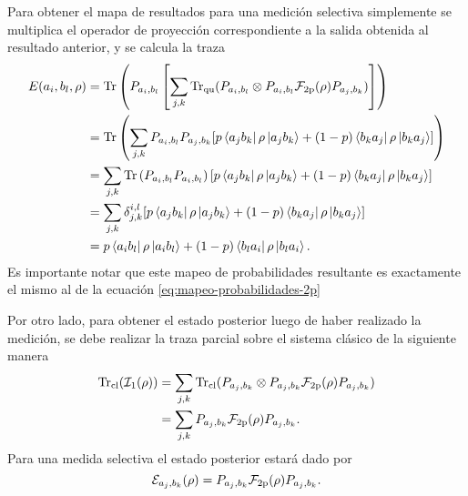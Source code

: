 Para obtener el mapa de resultados para una medición selectiva simplemente se
multiplica el operador de proyección correspondiente a la salida obtenida al
resultado anterior, y se calcula la traza\[\begin{split}
    E(a_i,b_l,\rho)&={\rm Tr}\left(P_{a_i, b_l}\left[\sum_{j,k}{\rm Tr}_{\text{qu}}(P_{a_i,b_l}\otimes P_{a_i,b_l} \mathcal{F}_{2\text{p}}(\rho) P_{a_j,b_k})\right]\right)\\
    &={\rm Tr}\left(\sum_{j,k} P_{a_i,b_l}P_{a_j,b_k}[p \bra{a_j b_k}\rho\ket{a_j b_k} +(1-p)\bra{b_k a_j}\rho \ket{b_k a_j}]\right)\\
    &=\sum_{j,k}{\rm Tr}\left( P_{a_i,b_l}P_{a_i,b_l}\right)[p \bra{a_j b_k}\rho\ket{a_j b_k} +(1-p)\bra{b_k a_j}\rho \ket{b_k a_j}]\\
    &=\sum_{j,k}\delta^{i,l}_{j,k}[p \bra{a_j b_k}\rho\ket{a_j b_k} +(1-p)\bra{b_k a_j}\rho \ket{b_k a_j}]\\
    &=p \bra{a_i b_l}\rho\ket{a_i b_l} +(1-p)\bra{b_l a_i}\rho \ket{b_l a_i}.
\end{split}\]Es importante notar que este mapeo de probabilidades resultante es exactamente el mismo al de la ecuación {\eqref{eq:mapeo-probabilidades-2p}}

Por otro lado, para obtener el estado posterior luego de haber realizado la medición, se debe realizar la traza parcial sobre el sistema clásico de la siguiente manera 
\begin{equation}\label{eq:traza_cl_1instrument2p}
    \begin{split}
      {\rm Tr}_{\text{cl}}(\mathcal{I}_1{(\rho)})&=\sum_{j,k}{\rm Tr}_{\text{cl}}(P_{a_j,b_k}\otimes P_{a_j,b_k} \mathcal{F}_{2\text{p}}(\rho) P_{a_j,b_k})\\
    &=\sum_{j,k}P_{a_j,b_k} \mathcal{F}_{2\text{p}}(\rho) P_{a_j,b_k}.
\end{split}
\end{equation}Para una medida selectiva el estado posterior estará dado por
\[\mathcal{E}_{a_j,b_k}(\rho)=P_{a_j,b_k} \mathcal{F}_{2\text{p}}(\rho) P_{a_j,b_k}.\]



  

